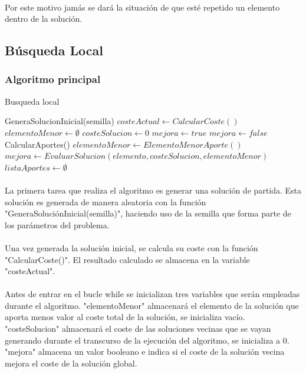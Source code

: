 \documentclass{article}
\begin{document}
	\paragraph{}Por este motivo jamás se dará la situación de que esté repetido un elemento dentro de la solución.

	
	\subsection{Búsqueda Local}
	
	\subsubsection{Algoritmo principal}
	\begin{algorithm}[H]
		\caption{Busqueda local}
		\begin{algorithmic}
			\STATE GeneraSolucionInicial(semilla)
			\STATE $costeActual \leftarrow CalcularCoste()$
			\STATE $elementoMenor \leftarrow \emptyset$
			\STATE $costeSolucion \leftarrow 0$
			\STATE $mejora \leftarrow true$
			\STATE $mejora \leftarrow false$
			\STATE CalcularAportes()
			\STATE $elementoMenor \leftarrow ElementoMenorAporte()$
			\STATE $mejora \leftarrow EvaluarSolucion(elemento, costeSolucion, elementoMenor)$
			\ENDIF
			\ENDFOR
			\STATE $listaAportes \leftarrow \emptyset$
			\ENDWHILE
		\end{algorithmic}
	\end{algorithm}

	\paragraph{} La primera tarea que realiza el algoritmo es generar una solución de partida. Esta solución es generada de manera aleatoria con la función "GeneraSoluciónInicial(semilla)", haciendo uso de la semilla que forma parte de los parámetros del problema.
	
	\paragraph{}Una vez generada la solución inicial, se calcula su coste con la función "CalcularCoste()". El resultado calculado se almacena en la variable "costeActual".
	
	\paragraph{}Antes de entrar en el bucle while se inicializan tres variables que serán empleadas durante el algoritmo. "elementoMenor" almacenará el elemento de la solución que aporta menos valor al coste total de la solución, se inicializa vacío. "costeSolucion" almacenará el coste de las soluciones vecinas que se vayan generando durante el transcurso de la ejecución del algoritmo, se inicializa a 0. "mejora" almacena un valor booleano e indica si el coste de la solución vecina mejora el coste de la solución global.
	
\end{document}
